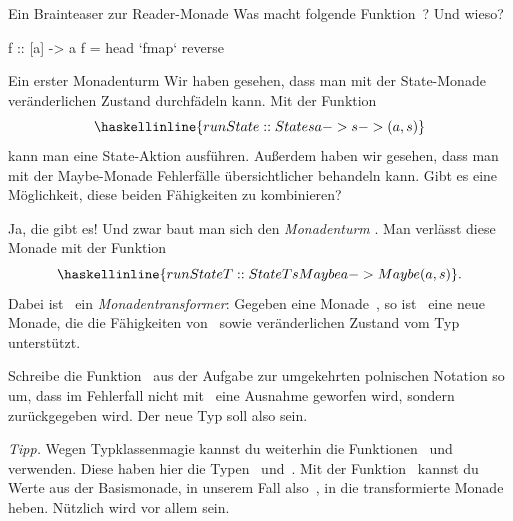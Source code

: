 \documentclass{uebblatt}
\begin{document}
\begin{aufgabe}{Ein Brainteaser zur Reader-Monade}
Was macht folgende Funktion~? Und wieso?

\begin{haskellcode}
f :: [a] -> a
f = head `fmap` reverse
\end{haskellcode}
\end{aufgabe}

\begin{aufgabe}{Ein erster Monadenturm}
Wir haben gesehen, dass man mit der State-Monade veränderlichen Zustand
durchfädeln kann. Mit der Funktion
\[ \haskellinline{runState :: State s a -> s -> (a,s)} \]
kann man eine State-Aktion ausführen. Außerdem haben wir gesehen, dass man mit
der Maybe-Monade Fehlerfälle übersichtlicher behandeln kann. Gibt es eine
Möglichkeit, diese beiden Fähigkeiten zu kombinieren?

Ja, die gibt es! Und zwar baut man sich den \emph{Monadenturm}
. Man verlässt diese Monade mit der Funktion
\[ \haskellinline{runStateT :: StateT s Maybe a -> Maybe (a, s)}. \]
Dabei ist~ ein \emph{Monadentransformer}: Gegeben eine
Monade~, so ist~ eine neue Monade,
die die Fähigkeiten von~ sowie veränderlichen Zustand vom
Typ~ unterstützt.

Schreibe die Funktion~ aus der Aufgabe zur umgekehrten polnischen Notation so um, dass
im Fehlerfall nicht mit~ eine Ausnahme geworfen wird,
sondern~ zurückgegeben wird. Der neue Typ soll also
 sein.

{\scriptsize\emph{Tipp.} Wegen Typklassenmagie kannst du weiterhin die
Funktionen~ und~ verwenden. Diese haben
hier die Typen~
und~. Mit der
Funktion~ kannst du
Werte aus der Basismonade, in unserem Fall also~, in die
transformierte Monade heben. Nützlich wird vor allem  sein.\par}
\end{aufgabe}
\end{document}
